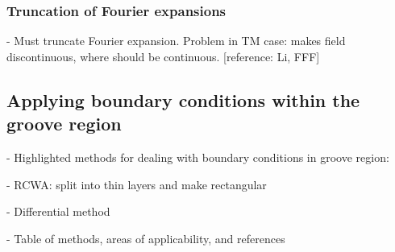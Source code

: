 \subsubsection{Truncation of Fourier expansions}
               - Must truncate Fourier expansion.  Problem in TM case: makes field discontinuous, where should be continuous. [reference: Li, FFF]
\subsection{Applying boundary conditions within the groove region}
          - Highlighted methods for dealing with boundary conditions in groove region:
          
               - RCWA: split into thin layers and make rectangular
               
               - Differential method
               
          - Table of methods, areas of applicability, and references
          
